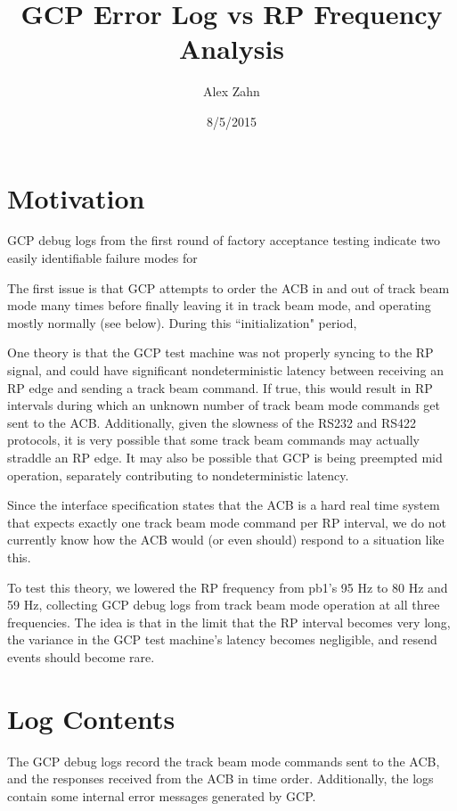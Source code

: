 \documentclass[12pt]{article}
\begin{document}
\title{GCP Error Log vs RP Frequency Analysis}
\date{8/5/2015}
\author{Alex Zahn}

\maketitle

\section{Motivation}

GCP debug logs from the first round of factory acceptance testing indicate two easily identifiable failure modes for 

The first issue is that GCP attempts to order the ACB in and out of track beam mode many times before finally leaving it in track beam mode, and operating mostly normally (see below). During this ``initialization" period, 


One theory is that the GCP test machine was not properly syncing to the RP signal, and could have significant nondeterministic latency between receiving an RP edge and sending a track beam command. If true, this would result in RP intervals during which an unknown number of track beam mode commands get sent to the ACB. Additionally, given the slowness of the RS232 and RS422 protocols, it is very possible that some track beam commands may actually straddle an RP edge. It may also be possible that GCP is being preempted mid operation, separately contributing to nondeterministic latency.

Since the interface specification states that the ACB is a hard real time system that expects exactly one track beam mode command per RP interval, we do not currently know how the ACB would (or even should) respond to a situation like this. 

To test this theory, we lowered the RP frequency from pb1's 95 Hz to 80 Hz and 59 Hz, collecting GCP debug logs from track beam mode operation at all three frequencies. The idea is that in the limit that the RP interval becomes very long, the variance in the GCP test machine's latency becomes negligible, and resend events should become rare.

\section{Log Contents}

The GCP debug logs record the track beam mode commands sent to the ACB, and the responses received from the ACB in time order. Additionally, the logs contain some internal error messages generated by GCP.
\end{document}

